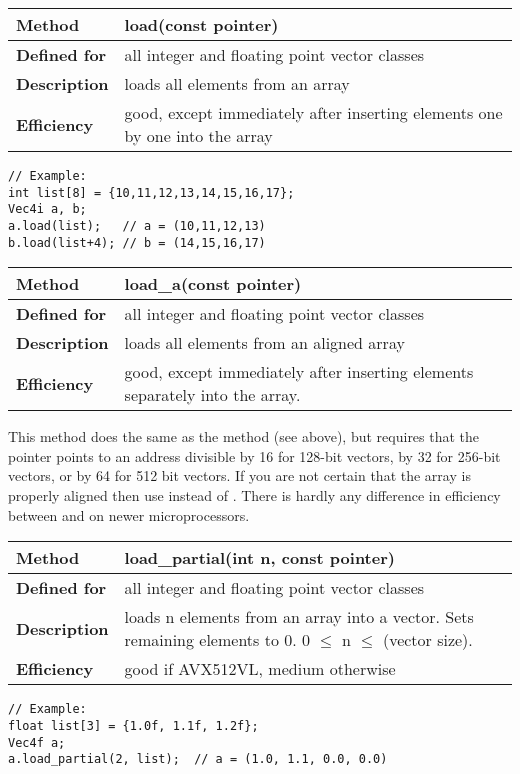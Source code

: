 \documentclass[vcl_manual.tex]{subfiles}
\begin{document}
\begin{tabular}{|p{25mm}|p{100mm}|}
\hline
\bfseries Method & load(const pointer) \\ \hline
\bfseries Defined for & all integer and floating point vector classes \\ \hline
\bfseries Description & loads all elements from an array \\ \hline
\bfseries Efficiency & good, except immediately after inserting elements one by one into the array \\ \hline
\end{tabular}
\begin{lstlisting}[frame=none]
// Example:
int list[8] = {10,11,12,13,14,15,16,17};
Vec4i a, b;
a.load(list);   // a = (10,11,12,13)
b.load(list+4); // b = (14,15,16,17)
\end{lstlisting}

\begin{tabular}{|p{25mm}|p{100mm}|}
\hline
\bfseries Method & load\_a(const pointer) \\ \hline
\bfseries Defined for & all integer and floating point vector classes \\ \hline
\bfseries Description & loads all elements from an aligned array \\ \hline
\bfseries Efficiency & good, except immediately after inserting elements separately into the array. \\ \hline
\end{tabular}

This method does the same as the  method (see above), but requires that the pointer points to an address divisible by 16 for 128-bit vectors, by 32 for 256-bit vectors, or by 64 for 512 bit vectors. If you are not certain that the array is properly aligned then use  instead of . There is hardly any difference in efficiency between  and  on newer microprocessors.



\begin{tabular}{|p{25mm}|p{100mm}|}
\hline
\bfseries Method & load\_partial(int n, const pointer) \\ \hline
\bfseries Defined for & all integer and floating point vector classes \\ \hline
\bfseries Description & loads n elements from an array into a vector. Sets remaining elements to 0. 0 $\leq$ n $\leq$ (vector size). \\ \hline
\bfseries Efficiency & good if AVX512VL, medium otherwise \\ \hline
\end{tabular}
\begin{lstlisting}[frame=none]
// Example:
float list[3] = {1.0f, 1.1f, 1.2f};
Vec4f a;
a.load_partial(2, list);  // a = (1.0, 1.1, 0.0, 0.0)
\end{lstlisting}
\end{document}
